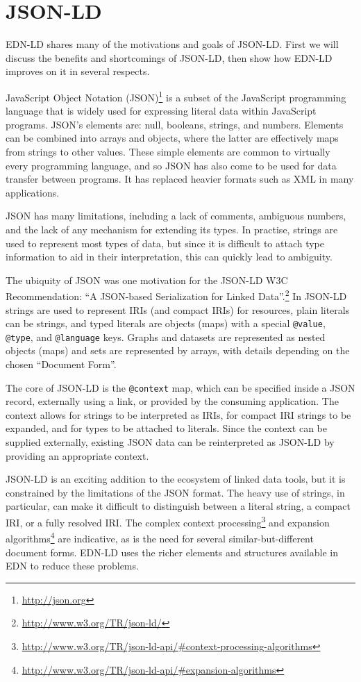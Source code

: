 \documentclass{icbo}
\begin{document}
\section{JSON-LD}

EDN-LD shares many of the motivations and goals of JSON-LD. First we will discuss the benefits and shortcomings of JSON-LD, then show how EDN-LD improves on it in several respects.

JavaScript Object Notation (JSON)\footnote{\url{http://json.org}} is a subset of the JavaScript programming language that is widely used for expressing literal data within JavaScript programs. JSON's elements are: null, booleans, strings, and numbers. Elements can be combined into arrays and objects, where the latter are effectively maps from strings to other values. These simple elements are common to virtually every programming language, and so JSON has also come to be used for data transfer between programs. It has replaced heavier formats such as XML in many applications.

JSON has many limitations, including a lack of comments, ambiguous numbers, and the lack of any mechanism for extending its types. In practise, strings are used to represent most types of data, but since it is difficult to attach type information to aid in their interpretation, this can quickly lead to ambiguity.

The ubiquity of JSON was one motivation for the JSON-LD W3C Recommendation: ``A JSON-based Serialization for Linked Data''.\footnote{\url{http://www.w3.org/TR/json-ld/}} In JSON-LD strings are used to represent IRIs (and compact IRIs) for resources, plain literals can be strings, and typed literals are objects (maps) with a special {\tt @value}, {\tt @type}, and {\tt @language} keys. Graphs and datasets are represented as nested objects (maps) and sets are represented by arrays, with details depending on the chosen ``Document Form''.

The core of JSON-LD is the {\tt @context} map, which can be specified inside a JSON record, externally using a link, or provided by the consuming application. The context allows for strings to be interpreted as IRIs, for compact IRI strings to be expanded, and for types to be attached to literals. Since the context can be supplied externally, existing JSON data can be reinterpreted as JSON-LD by providing an appropriate context.

JSON-LD is an exciting addition to the ecosystem of linked data tools, but it is constrained by the limitations of the JSON format. The heavy use of strings, in particular, can make it difficult to distinguish between a literal string, a compact IRI, or a fully resolved IRI.
The complex context processing\footnote{\url{http://www.w3.org/TR/json-ld-api/\#context-processing-algorithms}}
and expansion algorithms\footnote{\url{http://www.w3.org/TR/json-ld-api/\#expansion-algorithms}}
are indicative, as is the need for several similar-but-different document forms.
EDN-LD uses the richer elements and structures available in EDN to reduce these problems.
\end{document}
